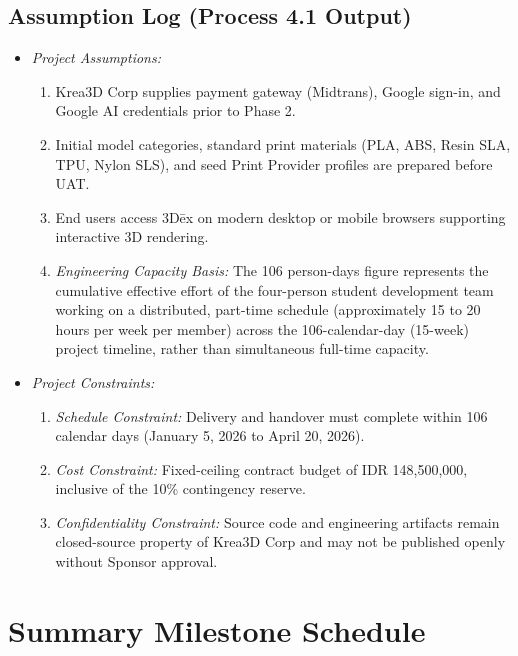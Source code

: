 \documentclass[11pt,a4paper]{article}
\begin{document}
\subsection{Assumption Log (Process 4.1 Output)}
\begin{itemize}[leftmargin=1.5em, itemsep=2pt]
    \item \textit{Project Assumptions:}
    \begin{enumerate}[leftmargin=1.5em, itemsep=1pt]
        \item Krea3D Corp supplies payment gateway (Midtrans), Google sign-in, and Google AI credentials prior to Phase 2.
        \item Initial model categories, standard print materials (PLA, ABS, Resin SLA, TPU, Nylon SLS), and seed Print Provider profiles are prepared before UAT.
        \item End users access 3D\={e}x on modern desktop or mobile browsers supporting interactive 3D rendering.
        \item \textit{Engineering Capacity Basis:} The 106 person-days figure represents the cumulative effective effort of the four-person student development team working on a distributed, part-time schedule (approximately 15 to 20 hours per week per member) across the 106-calendar-day (15-week) project timeline, rather than simultaneous full-time capacity.
    \end{enumerate}
    \item \textit{Project Constraints:}
    \begin{enumerate}[leftmargin=1.5em, itemsep=1pt]
        \item \textit{Schedule Constraint:} Delivery and handover must complete within 106 calendar days (January 5, 2026 to April 20, 2026).
        \item \textit{Cost Constraint:} Fixed-ceiling contract budget of IDR 148,500,000, inclusive of the 10\% contingency reserve.
        \item \textit{Confidentiality Constraint:} Source code and engineering artifacts remain closed-source property of Krea3D Corp and may not be published openly without Sponsor approval.
    \end{enumerate}
\end{itemize}

\section{Summary Milestone Schedule}
\end{document}
